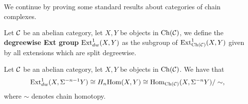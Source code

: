 We continue by proving some standard results about categories of chain complexes.


\begin{definition}
    Let $\mathcal{C}$ be an abelian category, let $X,Y$ be objects in $\mathrm{Ch}(\mathcal{C})$, we define the \textbf{degreewise Ext group} $\mathrm{Ext}^1_{dw}(X, Y)$ as the subgroup of $\mathrm{Ext}^1_{\mathrm{Ch}(\mathcal{C})}(X, Y)$ given by all extensions which are split degreewise. 
\end{definition}

\begin{lemma}
    \label{lem:deg-ext}
    Let $\mathcal{C}$ be an abelian category, let $X,Y$ be objects in $\mathrm{Ch}(\mathcal{C})$. We have that
    \[\mathrm{Ext}^1_{dw}(X, \Sigma^{-n-1} Y) \cong H_n\mathrm{Hom}(X,Y) \cong  \mathrm{Hom}_{\mathrm{Ch}(\mathcal{C})}(X, \Sigma^{-n} Y) / \sim,\]
    where $\sim$ denotes chain homotopy.
\end{lemma}

